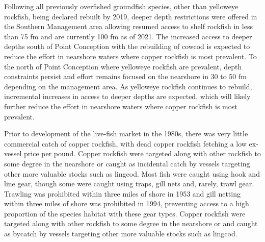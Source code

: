 \documentclass[11pt,
  english,
  a4paper,
]{article}
\begin{document}
\leavevmode\tagmcend\tagstructend\par


Following all previously overfished groundfish species, other than yelloweye rockfish, being declared rebuilt by 2019, deeper depth restrictions were offered in the Southern Management area allowing resumed access to shelf rockfish in less than 75 fm and are currently 100 fm as of 2021. The increased access to deeper depths south of Point Conception with the rebuilding of cowcod is expected to reduce the effort in nearshore waters where copper rockfish is most prevalent. To the north of Point Conception where yelloweye rockfish are prevalent, depth constraints persist and effort remains focused on the nearshore in 30 to 50 fm depending on the management area. As yelloweye rockfish continues to rebuild, incremental increases in access to deeper depths are expected, which will likely further reduce the effort in nearshore waters where copper rockfish is most prevalent.

\leavevmode\tagmcend\tagstructend\par


Prior to development of the live-fish market in the 1980s, there was very little commercial catch of copper rockfish, with dead copper rockfish fetching a low ex-vessel price per pound. Copper rockfish were targeted along with other rockfish to some degree in the nearshore or caught as incidental catch by vessels targeting other more valuable stocks such as lingcod. Most fish were caught using hook and line gear, though some were caught using traps, gill nets and, rarely, trawl gear. Trawling was prohibited within three miles of shore in 1953 and gill netting within three miles of shore was prohibited in 1994, preventing access to a high proportion of the species habitat with these gear types. Copper rockfish were targeted along with other rockfish to some degree in the nearshore or and caught as bycatch by vessels targeting other more valuable stocks such as lingcod.

\leavevmode\tagmcend\tagstructend\par

\end{document}
